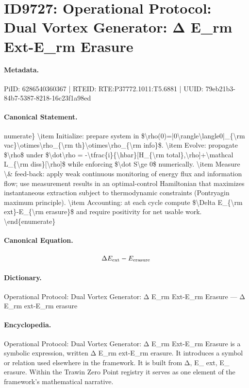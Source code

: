 \section*{ID9727: Operational Protocol: Dual Vortex Generator: Δ E\_rm Ext-E\_rm Erasure}
\paragraph{Metadata.}
PiID: 6286540360367 | RTEID: RTE:P37772.1011:T5.6881 | UUID: 79eb21b3-84b7-5387-8218-16c23f1a98ed

\paragraph{Canonical Statement.}
numerate\} \textbackslash{}item Initialize: prepare system in \$\textbackslash{}rho(0)=|0\textbackslash{}rangle\textbackslash{}langle0|\_\{\textbackslash{}rm vac\}\textbackslash{}otimes\textbackslash{}rho\_\{\textbackslash{}rm th\}\textbackslash{}otimes\textbackslash{}rho\_\{\textbackslash{}rm info\}\$. \textbackslash{}item Evolve: propagate \$\textbackslash{}rho\$ under \$\textbackslash{}dot\textbackslash{}rho = -\textbackslash{}tfrac\{i\}\{\textbackslash{}hbar\}[H\_\{\textbackslash{}rm total\},\textbackslash{}rho]+\textbackslash{}mathcal L\_\{\textbackslash{}rm diss\}[\textbackslash{}rho]\$ while enforcing \$\textbackslash{}dot S\textbackslash{}ge 0\$ numerically. \textbackslash{}item Measure \textbackslash{}\& feed-back: apply weak continuous monitoring of energy flux and information flow; use measurement results in an optimal-control Hamiltonian that maximizes instantaneous extraction subject to thermodynamic constraints (Pontryagin maximum principle). \textbackslash{}item Accounting: at each cycle compute \$\textbackslash{}Delta E\_\{\textbackslash{}rm ext\}-E\_\{\textbackslash{}rm erasure\}\$ and require positivity for net usable work. \textbackslash{}end\{enumerate\}

\paragraph{Canonical Equation.}
\[
\Delta E_{\rm ext}-E_{\rm erasure}
\]

\paragraph{Dictionary.}
Operational Protocol: Dual Vortex Generator: Δ E\_rm Ext-E\_rm Erasure — Δ E\_rm ext-E\_rm erasure

\paragraph{Encyclopedia.}
Operational Protocol: Dual Vortex Generator: Δ E\_rm Ext-E\_rm Erasure is a symbolic expression, written Δ E\_rm ext-E\_rm erasure. It introduces a symbol or relation used elsewhere in the framework. It is built from Δ, E\_ ext, E\_ erasure. Within the Trawin Zero Point registry it serves as one element of the framework's mathematical narrative.
